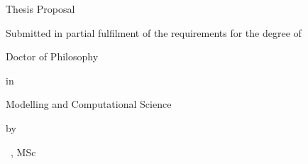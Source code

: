 \begin{titlepage}

%
%
%
%
%
%
\thispagestyle{empty}

\begin{center}


\vspace*{2\bigskipamount}

{\makeatletter
{}\LARGE\@title
\makeatother}

{\makeatletter
\ifx\@subtitle\undefined\else
    \bigskip
    \Large\@subtitle
\fi
\makeatother}

\vfill


{\Large{} Thesis Proposal}

\bigskip
\bigskip

Submitted in partial fulfilment of the requirements for the degree of 

 \medskip

{\large{Doctor of Philosophy}}


in


{\large{Modelling and Computational Science}}



\bigskip
\bigskip

by

\bigskip
\bigskip

\makeatletter
{\Large{}\@firstname\ {\@lastname, MSc}}
\makeatother

\bigskip
\bigskip


\end{center}
\end{titlepage}
